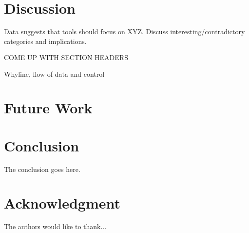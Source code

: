 \documentclass[conference]{IEEEtran}
\begin{document}
\section{Discussion}
\label{sec:disc}
Data suggests that tools should focus on XYZ. Discuss interesting/contradictory categories and implications.

COME UP WITH SECTION HEADERS

Whyline, flow of data and control

\section{Future Work}
\label{sec:fw}

\section{Conclusion}
\label{sec:concl}
The conclusion goes here.






\section*{Acknowledgment}


The authors would like to thank...




%




\end{document}
